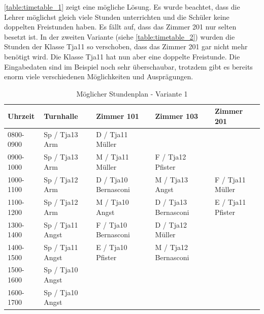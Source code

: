 \FloatBarrier
\autoref{table:timetable_1} zeigt eine mögliche Lösung. Es wurde beachtet, dass die Lehrer möglichst gleich viele Stunden unterrichten und die Schüler keine doppelten Freistunden haben. Es 
fällt auf, dass das Zimmer 201 nur selten besetzt ist. In der zweiten Variante (siehe \autoref{table:timetable_2}) wurden die Stunden der Klasse Tja11 so verschoben, dass 
das Zimmer 201 gar nicht mehr benötigt wird. Die Klasse Tja11 hat nun aber eine doppelte Freistunde. Die Eingabedaten sind im Beispiel noch sehr überschaubar, 
trotzdem gibt es bereits enorm viele verschiedenen Möglichkeiten und Ausprägungen.

\begin{table}[ht]
\centering
  \begin{tabular}{ l | p{2.3cm} | p{2.3cm} | p{2.3cm} | p{2.3cm}}
	\hline
	\rowcolor{gray}
	\textbf{Uhrzeit} 	& \textbf{Turnhalle}	& \textbf{Zimmer 101} 	& \textbf{Zimmer 103}	&  \textbf{Zimmer 201}\\ \hline
	0800-0900		& Sp / Tja13 \mbox{Arm}		& D / Tja11 \mbox{Müller}			& 						& \\ \hline
	0900-1000		& Sp / Tja13 \mbox{Arm}		& M / Tja11 \mbox{Müller}			& F / Tja12 \mbox{Pfister}			& \\ \hline
	1000-1100		& Sp / Tja12 \mbox{Arm}		& D / Tja10 \mbox{Bernasconi}		& M / Tja13 \mbox{Angst}			& F / Tja11 \mbox{Müller}\\ \hline
	1100-1200		& Sp / Tja12 \mbox{Arm}		& M / Tja10 \mbox{Angst}			& D / Tja13 \mbox{Bernasconi}		& E / Tja11 \mbox{Pfister}\\ \hline \hline
	1300-1400		& Sp / Tja11 \mbox{Angst}	& F / Tja10 \mbox{Bernasconi}		& D / Tja12 \mbox{Müller	}		& \\ \hline
	1400-1500		& Sp / Tja11 \mbox{Angst}	& E / Tja10 \mbox{Pfister}			& M / Tja12 \mbox{Bernasconi}		& \\ \hline
	1500-1600		& Sp / Tja10 \mbox{Angst}	& 						& 						& \\ \hline
	1600-1700		& Sp / Tja10 \mbox{Angst}	& 						& 						& \\ \hline
  \end{tabular}
   \caption{Möglicher Stundenplan - Variante 1}\label{table:timetable_1}
\end{table}

